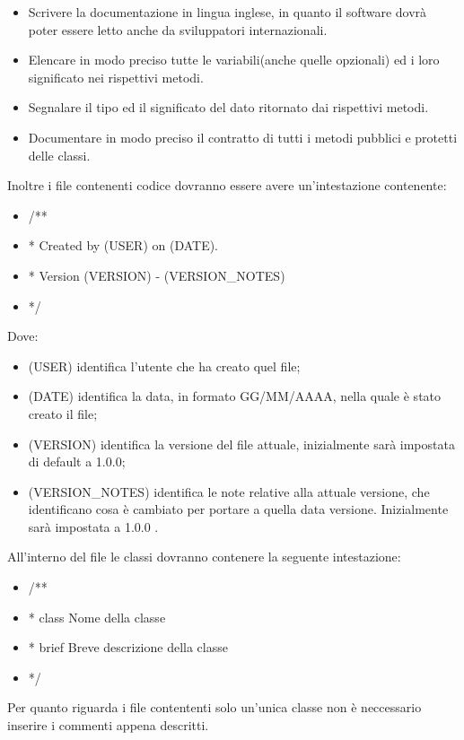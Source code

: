 \begin{itemize}
\item Scrivere la documentazione in lingua inglese, in quanto il software dovrà poter essere letto anche da sviluppatori internazionali.
\item Elencare in modo preciso tutte le variabili(anche quelle opzionali) ed i loro significato nei rispettivi metodi.
\item Segnalare il tipo ed il significato del dato ritornato dai rispettivi metodi.
\item Documentare in modo preciso il contratto di tutti i metodi pubblici e protetti delle classi.
\end{itemize}
Inoltre i file contenenti codice dovranno essere avere un’intestazione contenente:
\begin{itemize}
\color{ForestGreen}
\item /** 
\item *   Created by (USER) on (DATE).
\item *   Version (VERSION) - (VERSION\_NOTES)
\item */
\end{itemize}
Dove:
\begin{itemize}
\color{ForestGreen}
\item (USER) identifica l'utente che ha creato quel file;
\item (DATE) identifica la data, in formato GG/MM/AAAA, nella quale è stato creato il file;
\item (VERSION) identifica la versione del file attuale, inizialmente sarà impostata di default a 1.0.0;
\item (VERSION\_NOTES) identifica le note relative alla attuale versione, che identificano cosa è cambiato per portare a quella data versione. Inizialmente sarà impostata a 1.0.0 .
\end{itemize}



All'interno del file le classi dovranno contenere la seguente intestazione:
\begin{itemize}
\color{ForestGreen}
\item /**
\item *  class Nome della classe
\item *  brief Breve descrizione della classe
\item */
\end{itemize}
Per quanto riguarda i file contententi solo un'unica classe non è neccessario inserire i commenti appena descritti.




